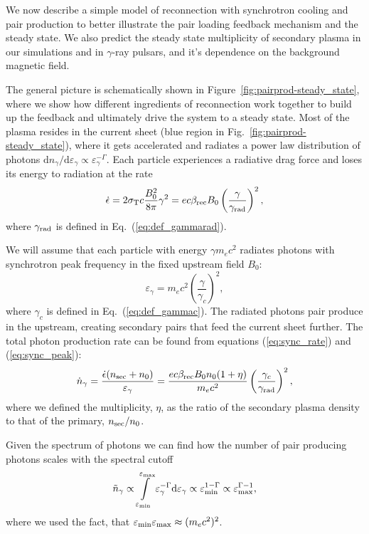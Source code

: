 We now describe a simple model of reconnection with synchrotron cooling and pair production to better illustrate the pair loading feedback mechanism and the steady state. We also predict the steady state multiplicity of secondary plasma in our simulations and in $\gamma$-ray pulsars, and it's dependence on the background magnetic field.

The general picture is schematically shown in Figure~\ref{fig:pairprod-steady_state}, where we show how different ingredients of reconnection work together to build up the feedback and ultimately drive the system to a steady state. Most of the plasma resides in the current sheet (blue region in Fig.~\ref{fig:pairprod-steady_state}), where it gets accelerated and radiates a power law distribution of photons $\mathrm{d}n_\gamma/\mathrm{d}\varepsilon_\gamma\propto\varepsilon_\gamma^{-\Gamma}$. Each particle experiences a radiative drag force and loses its energy to radiation at the rate
\begin{equation}
    \label{eq:sync_rate}
    \dot{\epsilon} = 2\sigma_{\rm T} c \frac{B_0^2}{8\pi}\gamma^2 = e c \beta_{\rm rec} B_0 \left(\frac{\gamma}{\gamma_{\rm rad}}\right)^2,
\end{equation}
where $\gamma_{\rm rad}$ is defined in Eq.~(\ref{eq:def_gammarad}).

We will assume that each particle with energy $\gamma m_e c^2$ radiates photons with synchrotron peak frequency in the fixed upstream field $B_0$:
\begin{equation}
    \label{eq:sync_peak}
    \varepsilon_\gamma = m_e c^2\left(\frac{\gamma}{\gamma_c}\right)^2,
\end{equation}
where $\gamma_c$ is defined in Eq.~(\ref{eq:def_gammac}). The radiated photons pair produce in the upstream, creating secondary pairs that feed the current sheet further. The total photon production rate can be found from  equations (\ref{eq:sync_rate}) and (\ref{eq:sync_peak}):
\begin{equation}\label{eq:photon_rate}
    \dot{n}_\gamma = \frac{\dot{\epsilon} (n_{\rm sec} + n_0)}{\varepsilon_\gamma} = \frac{e c \beta_{\rm rec} B_0 n_0 (1+\eta)}{m_e c^2}\left(\frac{\gamma_c}{\gamma_{\rm rad}}\right)^2,
\end{equation}
where we defined the multiplicity, $\eta$, as the ratio of the secondary plasma density to that of the primary, $n_{\rm sec} / n_0$.

Given the spectrum of photons we can find how the number of pair producing photons scales with the spectral cutoff
\begin{equation}\label{eq:photon_pp_scale}
    \tilde{n}_\gamma \propto \int\limits_{\varepsilon_{\rm min}}^{\varepsilon_{\rm max}}\varepsilon_\gamma^{-\Gamma}\mathrm{d}\varepsilon_\gamma \propto \varepsilon_{\rm min}^{1-\Gamma}\propto \varepsilon_{\rm max}^{\Gamma - 1},
\end{equation}
where we used the fact, that $\varepsilon_{\rm min}\varepsilon_{\rm max}\approx (m_e c^2)^2$.

